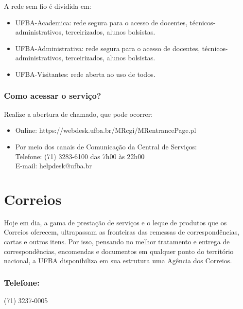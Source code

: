         A rede sem fio é dividida em: \\
        \begin{itemize}
            \item UFBA-Academica: rede segura para o acesso de docentes, técnicos-administrativos, terceirizados, alunos bolsistas. \\
            
            \item UFBA-Administrativa: rede segura para o acesso de docentes, técnicos-administrativos, terceirizados, alunos bolsistas. \\
            
            \item UFBA-Visitantes: rede aberta ao uso de todos.
        \end{itemize}
        
    \subsubsection{Como acessar o serviço?}
        Realize a abertura de chamado, que pode ocorrer:
        
        \begin{itemize}
            \item Online: https://webdesk.ufba.br/MRcgi/MRentrancePage.pl \\
            
            \item Por meio dos canais de Comunicação da Central de Serviços:\\
            Telefone: (71) 3283-6100 das 7h00 às 22h00 \\
            E-mail: helpdesk@ufba.br
        \end{itemize}

\section{Correios}

        Hoje em dia, a gama de prestação de serviços e o leque de produtos que os Correios oferecem, ultrapassam as fronteiras das remessas de correspondências, cartas e outros itens.
        Por isso, pensando no melhor tratamento e entrega de correspondências, encomendas e documentos em qualquer ponto do território nacional, a UFBA disponibiliza em sua estrutura uma Agência dos Correios.
        
        \subsubsection{Telefone:}
            (71) 3237-0005
            
